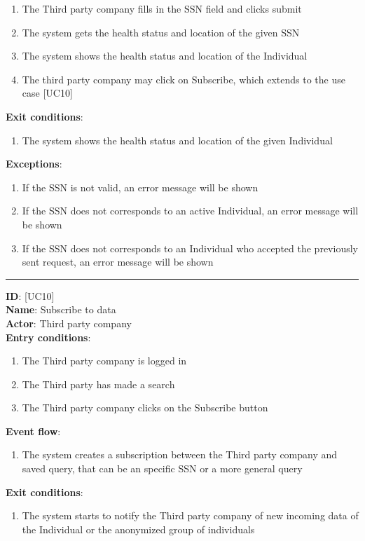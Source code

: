 \documentclass[a4paper, hidelinks, 12pt]{report}
\newcommand\usecase[1]{ [UC#1] }
\begin{document}
\begin{itemize}
\begin{enumerate}
			\item{The Third party company fills in the SSN field and clicks submit}
			\item{The system gets the health status and location of the given SSN}
			\item{The system shows the health status and location of the Individual}
			\item{The third party company may click on Subscribe, which extends to the use case \usecase{10}}
		\end{enumerate}
		\textbf{Exit conditions}:
		\begin{enumerate}
			\item{The system shows the health status and location of the given Individual}
		\end{enumerate}
		\textbf{Exceptions}:
		\begin{enumerate}
			\item{If the SSN is not valid, an error message will be shown}
			\item{If the SSN does not corresponds to an active Individual, an error message will be shown}
			\item{If the SSN does not corresponds to an Individual who accepted the previously sent request, an error message will be shown}
		\end{enumerate}
		\rule{\linewidth}{0.4pt}
		\textbf{ID}: \usecase{10} \\
		\textbf{Name}: Subscribe to data \\
		\textbf{Actor}: Third party company \\
		\textbf{Entry conditions}:
		\begin{enumerate}
			\item{The Third party company is logged in}
			\item{The Third party has made a search}
			\item{The Third party company clicks on the Subscribe button}
		\end{enumerate}
		\textbf{Event flow}:
		\begin{enumerate}
			\item{The system creates a subscription between the Third party company and saved query, that can be an specific SSN or a more general query}
		\end{enumerate}
		\textbf{Exit conditions}:
		\begin{enumerate}
			\item{The system starts to notify the Third party company of new incoming data of the Individual or the anonymized group of individuals}

\end{enumerate}
\end{itemize}
\end{document}
